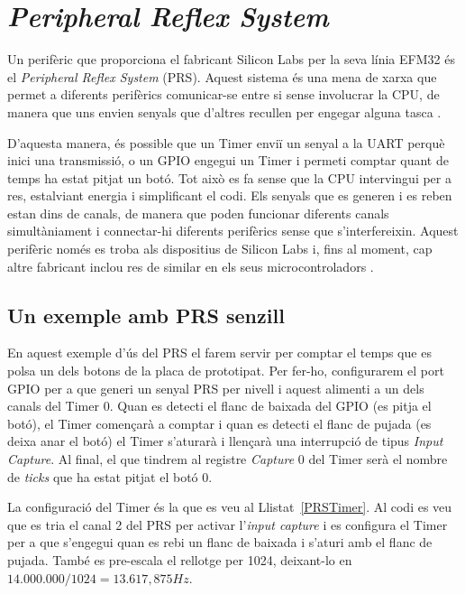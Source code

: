 \section{\em Peripheral Reflex System}

Un perifèric que proporciona el fabricant Silicon Labs per la seva línia EFM32 és el {\em Peripheral Reflex System} (\gls{PRS}). Aquest sistema és una mena de xarxa que permet a diferents perifèrics comunicar-se entre si sense involucrar la CPU, de manera que uns envien senyals que d'altres recullen per engegar alguna tasca \cite[135]{EFM32TGRM}. 

D'aquesta manera, és possible que un Timer enviï un senyal a la UART perquè inici una transmissió, o un GPIO engegui un Timer i permeti comptar quant de temps ha estat pitjat un botó. Tot això es fa sense que la CPU intervingui per a res, estalviant energia i simplificant el codi. Els senyals que es generen i es reben estan dins de canals, de manera que poden funcionar diferents canals simultàniament i connectar-hi diferents perifèrics sense que s'interfereixin. Aquest perifèric només es troba als dispositius de Silicon Labs i, fins al moment, cap altre fabricant inclou res de similar en els seus microcontroladors \cite{AN0025}.

\subsection{Un exemple amb PRS senzill}
En aquest exemple d'ús del \gls{PRS} el farem servir per comptar el temps que es polsa un dels botons de la placa de prototipat. Per fer-ho, configurarem el port GPIO per a que generi un senyal PRS per nivell i aquest alimenti a un dels canals del Timer 0. Quan es detecti el flanc de baixada del GPIO (es pitja el botó), el Timer començarà a comptar i quan es detecti el flanc de pujada (es deixa anar el botó) el Timer s'aturarà i llençarà una interrupció de tipus {\em Input Capture}. Al final, el que tindrem al registre {\em Capture} 0 del Timer serà el nombre de {\em ticks} que ha estat pitjat el botó 0.

La configuració del Timer és la que es veu al Llistat~\ref{PRSTimer}. Al codi es veu que es tria el canal 2 del PRS per activar l'{\em input capture} i es configura el Timer per a que s'engegui quan es rebi un flanc de baixada i s'aturi amb el flanc de pujada. També es pre-escala el rellotge per 1024, deixant-lo en $14.000.000 / 1024 = 13.617,875 Hz$.

